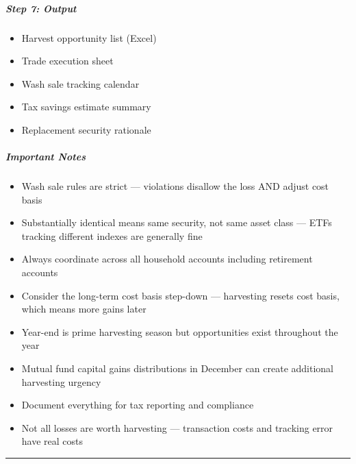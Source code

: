 \documentclass[11pt]{article}
\begin{document}
\subparagraph{Step 7: Output}\mbox{}\par

\begin{itemize}[leftmargin=*,itemsep=2pt,topsep=2pt]
\item {} Harvest opportunity list (Excel)
\item {} Trade execution sheet
\item {} Wash sale tracking calendar
\item {} Tax savings estimate summary
\item {} Replacement security rationale
\end{itemize}

\subparagraph{Important Notes}\mbox{}\par

\begin{itemize}[leftmargin=*,itemsep=2pt,topsep=2pt]
\item {} Wash sale rules are strict — violations disallow the loss AND adjust cost basis
\item {} Substantially identical means same security, not same asset class — ETFs tracking different indexes are generally fine
\item {} Always coordinate across all household accounts including retirement accounts
\item {} Consider the long-term cost basis step-down — harvesting resets cost basis, which means more gains later
\item {} Year-end is prime harvesting season but opportunities exist throughout the year
\item {} Mutual fund capital gains distributions in December can create additional harvesting urgency
\item {} Document everything for tax reporting and compliance
\item {} Not all losses are worth harvesting — transaction costs and tracking error have real costs
\end{itemize}

\vspace{0.8em}\hrule\vspace{0.8em}
\end{document}
